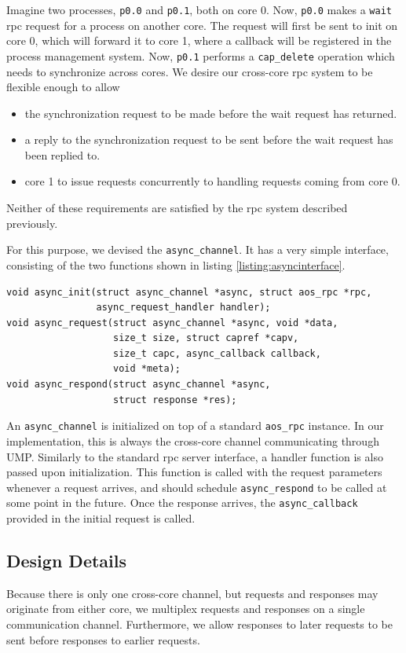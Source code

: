 Imagine two processes, \texttt{p0.0} and \texttt{p0.1}, both on core 0. Now, \texttt{p0.0} makes a \texttt{wait} rpc request for a process on another core. The request will first be sent to init on core 0, which will forward it to core 1, where a callback will be registered in the process management system. Now, \texttt{p0.1} performs a \texttt{cap\_delete} operation which needs to synchronize across cores. 
We desire our cross-core rpc system to be flexible enough to allow
\begin{itemize}
    \item the synchronization request to be made before the wait request has returned.
    \item a reply to the synchronization request to be sent before the wait request has been replied to.
    \item core 1 to issue requests concurrently to handling requests coming from core 0.
\end{itemize}
Neither of these requirements are satisfied by the rpc system described previously.

For this purpose, we devised the \texttt{async\_channel}. It has a very simple interface, consisting of the two functions shown in listing \ref{listing:asyncinterface}.

\begin{lstlisting}[caption={The interface for \texttt{async\_channel}},label={listing:asyncinterface}]
void async_init(struct async_channel *async, struct aos_rpc *rpc,
                async_request_handler handler);
void async_request(struct async_channel *async, void *data, 
                   size_t size, struct capref *capv,
                   size_t capc, async_callback callback, 
                   void *meta);
void async_respond(struct async_channel *async, 
                   struct response *res);
\end{lstlisting}

An \texttt{async\_channel} is initialized on top of a standard \texttt{aos\_rpc} instance. In our implementation, this is always the cross-core channel communicating through UMP. Similarly to the standard rpc server interface, a handler function is also passed upon initialization. This function is called with the request parameters whenever a request arrives, and should schedule \texttt{async\_respond} to be called at some point in the future. Once the response arrives, the \texttt{async\_callback} provided in the initial request is called.

\subsection{Design Details}
Because there is only one cross-core channel, but requests and responses may originate from either core, we multiplex requests and responses on a single communication channel. Furthermore, we allow responses to later requests to be sent before responses to earlier requests. 

